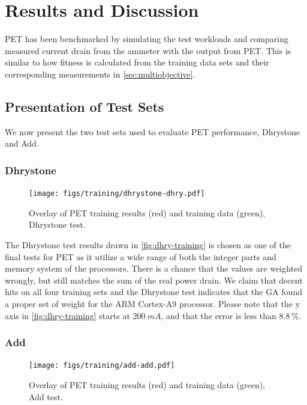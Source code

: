 \section{Results and Discussion}

PET has been benchmarked by simulating the test workloads and comparing measured
current drain from the ammeter with the output from PET. This is similar to how
fitness is calculated from the training data sets and their corresponding
measurements in \autoref{sec:multiobjective}.


\subsection{Presentation of Test Sets}

We now present the two test sets used to evaluate PET performance, Dhrystone and
Add.

\subsubsection{Dhrystone}

\begin{figure}[H]
\centering
\texttt{[image: figs/training/dhrystone-dhry.pdf]}
\caption{Overlay of PET training results (red) and training data (green),
Dhrystone test.}
\label{fig:dhry-training}
\end{figure}

The Dhrystone test results drawn in \autoref{fig:dhry-training} is chosen as one
of the final tests for PET as it utilize a wide range of both the integer parts
and memory system of the processors. There is a chance that the values are
weighted wrongly, but still matches the sum of the real power drain. We claim
that decent hits on all four training sets and the Dhrystone test indicates that
the GA found a proper set of weight for the ARM Cortex-A9 processor. Please note
that the y axis in \autoref{fig:dhry-training} starts at $200~mA$, and that the
error is less than $8.8~\%$.


\newpage

\subsubsection{Add}

\begin{figure}[ht]
\centering
\texttt{[image: figs/training/add-add.pdf]}
\caption{Overlay of PET training results (red) and training data (green), Add
test.}
\label{fig:add-training}
\end{figure}

